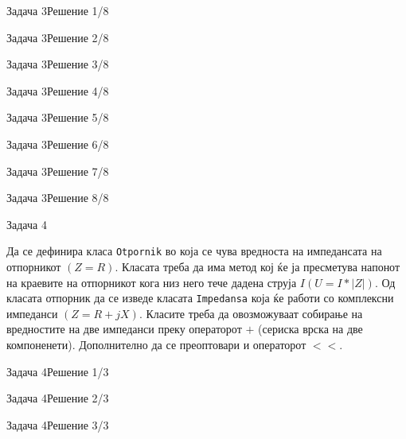 \begin{frame}[fragile]{Задача 3}{Решение 1/8}

\end{frame}
\begin{frame}[fragile]{Задача 3}{Решение 2/8}

\end{frame}
\begin{frame}[fragile,shrink=10]{Задача 3}{Решение 3/8}

\end{frame}
\begin{frame}[fragile,shrink=10]{Задача 3}{Решение 4/8}

\end{frame}
\begin{frame}[fragile,shrink=10]{Задача 3}{Решение 5/8}

\end{frame}
\begin{frame}[fragile,shrink=10]{Задача 3}{Решение 6/8}

\end{frame}
\begin{frame}[fragile,shrink=10]{Задача 3}{Решение 7/8}

\end{frame}
\begin{frame}[fragile]{Задача 3}{Решение 8/8}

\end{frame}


\begin{frame}{Задача 4}
\begin{scriptsize}
Да се дефинира класа \texttt{Otpornik} во која се чува вредноста на импедансата на
отпорникот $(Z=R)$. Класата треба да има метод кој ќе ја пресметува напонот на
краевите на отпорникот кога низ него тече дадена струја $I (U=I*|Z|)$. Од
класата отпорник да се изведе класата  \texttt{Impedansa} која ќе работи со комплексни импеданси
$(Z=R+jX)$. Класите треба да овозможуваат собирање на вредностите на две
импеданси преку операторот $+$ (сериска врска на две компоненети). Дополнително
да се преоптовари и операторот $<<$.

\end{scriptsize}
\end{frame}

\begin{frame}[fragile]{Задача 4}{Решение 1/3}

\end{frame}
\begin{frame}[fragile]{Задача 4}{Решение 2/3}

\end{frame}
\begin{frame}[fragile,shrink=10]{Задача 4}{Решение 3/3}

\end{frame}


